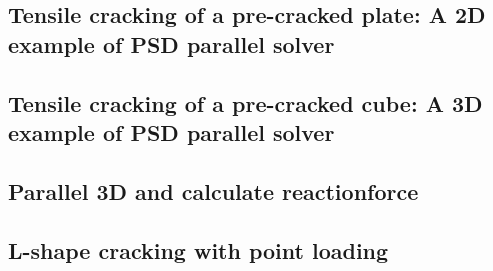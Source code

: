 \subsection{Tensile cracking of a pre-cracked plate: A 2D example of PSD parallel solver}


{
	\renewcommand{\subsection}{\subsubsection}
	
}


\subsection{Tensile cracking of a pre-cracked cube: A 3D example of PSD parallel solver}

{
	\renewcommand{\subsection}{\subsubsection}
	
}



\subsection{Parallel 3D and calculate reactionforce}


{
	\renewcommand{\subsection}{\subsubsection}
	
}


\subsection{L-shape cracking with point loading}
{
	\renewcommand{\subsection}{\subsubsection}
	
}

